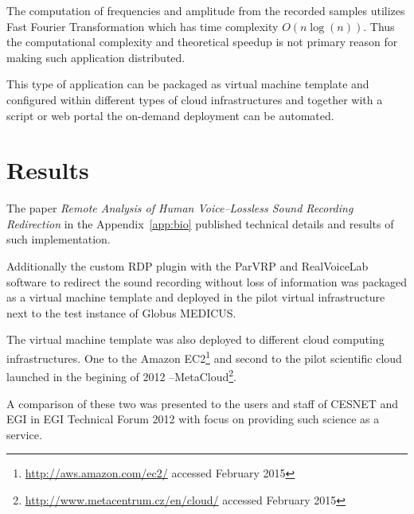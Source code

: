 The computation of frequencies and amplitude from the recorded samples utilizes Fast Fourier Transformation which has time complexity $O(n\log(n))$. Thus the computational complexity and theoretical speedup is not primary reason for making such application distributed. 

This type of application can be packaged as virtual machine template and configured within different types of cloud infrastructures and together with a script or web portal the on-demand deployment can be automated.

\section{Results}
\label{sec:resultsvoice}

The paper \cite{kulhanek2010b} \emph{Remote Analysis of Human Voice--Lossless Sound Recording Redirection} in the Appendix~\ref{app:bio} published technical details and results of such implementation.

Additionally the custom RDP plugin with the ParVRP and RealVoiceLab software to redirect the sound recording without loss of information was packaged as a virtual machine template and  deployed in the pilot virtual infrastructure next to the test instance of Globus MEDICUS.

The virtual machine template was also deployed to different cloud computing infrastructures. One to the Amazon EC2\footnote{\url{http://aws.amazon.com/ec2/} accessed February 2015} and second to the pilot scientific cloud launched in the begining of 2012 --MetaCloud\footnote{\url{http://www.metacentrum.cz/en/cloud/} accessed February 2015}.

 A comparison of these two was presented to the users and staff of CESNET and EGI in EGI Technical Forum 2012\cite{Kulhanek2012a} with focus on providing such science as a service.
 